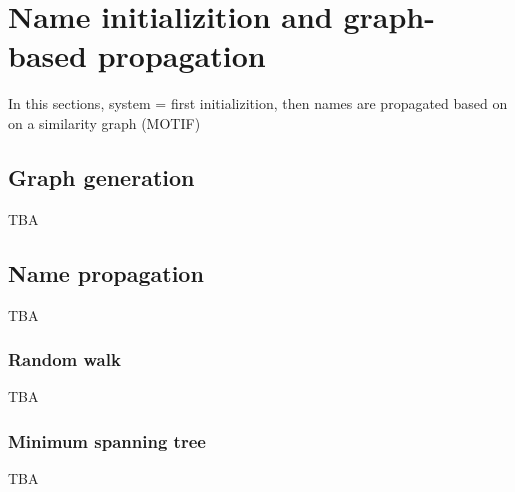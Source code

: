 \section{Name initializition and graph-based propagation}
\label{sec:graph}

In this sections, system = first initializition, then names are propagated based on on a similarity graph (MOTIF)

\subsection{Graph generation}

TBA

\subsection{Name propagation}

TBA

\subsubsection{Random walk}

TBA

\subsubsection{Minimum spanning tree}

TBA

\endinput
